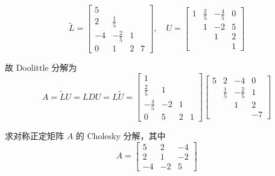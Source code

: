 \begin{solution}
                    \begin{equation*}
                        \widetilde{L} = \begin{bmatrix}
                            5 & & & \\ 2 & \frac{1}{5} & & \\ -4 & -\frac{2}{5} & 1 & \\ 0 & 1 & 2 & 7
                        \end{bmatrix}, \quad U = \begin{bmatrix}
                            1 & \frac{2}{5} & -\frac{4}{5} & 0 \\ & 1 & -2 & 5 \\ & & 1 & 2 \\ & & & 1
                        \end{bmatrix}
                    \end{equation*}
                    \par 故 Doolittle 分解为 
                    \begin{equation*}
                        A = \widetilde{L}U = LDU = L\widetilde{U} = \begin{bmatrix}
                            1 & & & \\ \frac{2}{5} & 1 & & \\ -\frac{4}{5} & -2 & 1 & \\ 0 & 5 & 2 & 1
                        \end{bmatrix}\begin{bmatrix}
                            5 & 2 & -4 & 0 \\ & \frac{1}{5} & -\frac{2}{5} & 1 \\ & & 1 & 2 \\ & & & -7
                        \end{bmatrix}
                    \end{equation*}
            \end{solution}
            \begin{problem}
                求对称正定矩阵 $A$ 的 Cholesky 分解，其中
                \begin{equation*}
                    A = \begin{bmatrix}
                        5 & 2 & -4 \\ 2 & 1 & -2 \\ -4 & -2 & 5
                    \end{bmatrix}
                \end{equation*}
            \end{problem} 
